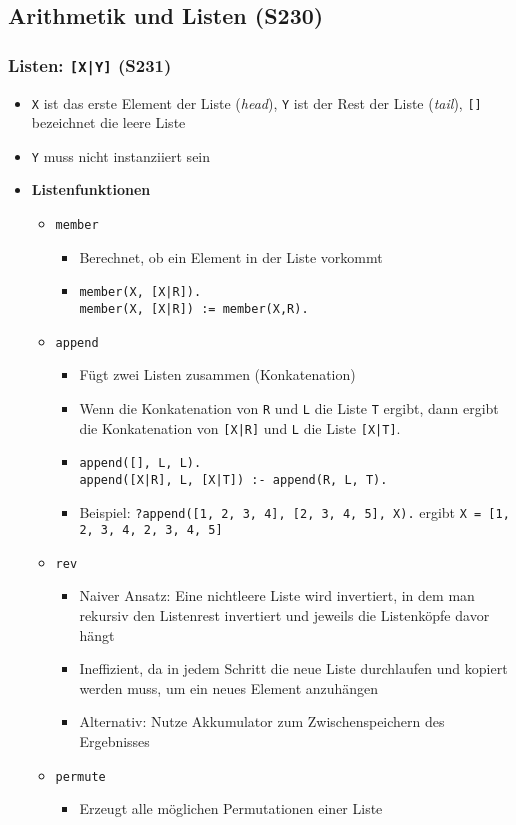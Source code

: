 \subsection{Arithmetik und Listen (S230)}

\subsubsection{Listen: \texttt{{[}X{|}Y{]}} (S231)}
\begin{itemize}
	\item \texttt{X} ist das erste Element der Liste (\textit{head}), \texttt{Y} ist der Rest der Liste (\textit{tail}), \texttt{{[}{]}} bezeichnet die leere Liste
	\item \texttt{Y} muss nicht instanziiert sein
	\item \textbf{Listenfunktionen}
	\begin{itemize}
		\item \texttt{member}
		\begin{itemize}
			\item Berechnet, ob ein Element in der Liste vorkommt
			\item \texttt{member(X, {[}X{|}R{]}).} \\ \texttt{member(X, {[}X{|}R{]}) := member(X,R).}
		\end{itemize}
		\item \texttt{append}
		\begin{itemize}
			\item Fügt zwei Listen zusammen (Konkatenation)
			\item Wenn die Konkatenation von \texttt{R} und \texttt{L} die Liste \texttt{T} ergibt, dann ergibt die Konkatenation von \texttt{{[}X{|}R{]}} und \texttt{L} die Liste \texttt{{[}X{|}T{]}}.
			\item \texttt{append({[]}, L, L).} \\ \texttt{append({[}X{|}R{]}, L, {[}X{|}T{]}) :- append(R, L, T).}
			\item Beispiel: \texttt{?append({[}1, 2, 3, 4{]}, {[}2, 3, 4, 5{]}, X).} ergibt \texttt{X = {[}1, 2, 3, 4, 2, 3, 4, 5{]}}
		\end{itemize}
		\item \texttt{rev}
		\begin{itemize}
			\item Naiver Ansatz: Eine nichtleere Liste wird invertiert, in dem man rekursiv den Listenrest invertiert und jeweils die Listenköpfe davor hängt
			\item Ineffizient, da in jedem Schritt die neue Liste durchlaufen und kopiert werden muss, um ein neues Element anzuhängen
			\item Alternativ: Nutze Akkumulator zum Zwischenspeichern des Ergebnisses
		\end{itemize}
		\item \texttt{permute}
		\begin{itemize}
			\item Erzeugt alle möglichen Permutationen einer Liste
		\end{itemize}
	\end{itemize}
\end{itemize}

